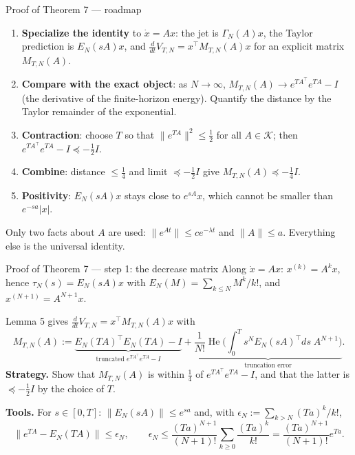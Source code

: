 \documentclass[10pt,aspectratio=169]{beamer}
\newcommand{\tr}{^{\top}}
\newcommand{\KK}{\mathcal{K}}
\DeclareMathOperator{\He}{He}
\begin{document}
\begin{frame}{Proof of Theorem 7 --- roadmap}
\begin{enumerate}
\item \textbf{Specialize the identity} to $\dot x=Ax$: the jet is $\Gamma_N(A)x$, the Taylor prediction is $E_N(sA)x$, and $\frac{d}{dt}V_{T,N}=x\tr M_{T,N}(A)x$ for an explicit matrix $M_{T,N}(A)$.
\item \textbf{Compare with the exact object}: as $N\to\infty$, $M_{T,N}(A)\to e^{TA\tr}e^{TA}-I$ (the derivative of the finite-horizon energy). Quantify the distance by the Taylor remainder of the exponential.
\item \textbf{Contraction}: choose $T$ so that $\|e^{TA}\|^2\le\frac12$ for all $A\in\KK$; then $e^{TA\tr}e^{TA}-I\preceq-\frac12I$.
\item \textbf{Combine}: distance $\le\frac14$ and limit $\preceq-\frac12I$ give $M_{T,N}(A)\preceq-\frac14I$.
\item \textbf{Positivity}: $E_N(sA)x$ stays close to $e^{sA}x$, which cannot be smaller than $e^{-sa}|x|$.
\end{enumerate}
\medskip
Only two facts about $A$ are used: $\|e^{At}\|\le ce^{-\lambda t}$ and $\|A\|\le a$. Everything else is the universal identity.
\end{frame}

\begin{frame}{Proof of Theorem 7 --- step 1: the decrease matrix}
Along $\dot x=Ax$: $x^{(k)}=A^kx$, hence $\tau_N(s)=E_N(sA)x$ with $E_N(M)=\sum_{k\le N}M^k/k!$, and $x^{(N+1)}=A^{N+1}x$.
\medskip

Lemma 5 gives $\frac{d}{dt}V_{T,N}=x\tr M_{T,N}(A)x$ with
\[
M_{T,N}(A):=\underbrace{E_N(TA)\tr E_N(TA)-I}_{\text{truncated }e^{TA\tr}e^{TA}-I}+\underbrace{\frac{1}{N!}\He\Big(\int_0^Ts^NE_N(sA)\tr ds\;A^{N+1}\Big)}_{\text{truncation error}} .
\]
\medskip
\textbf{Strategy.} Show that $M_{T,N}(A)$ is within $\frac14$ of $e^{TA\tr}e^{TA}-I$, and that the latter is $\preceq-\frac12I$ by the choice of $T$.
\medskip

\textbf{Tools.} For $s\in[0,T]$: $\|E_N(sA)\|\le e^{sa}$ and, with $\epsilon_N:=\sum_{k>N}(Ta)^k/k!$,
\[
\|e^{TA}-E_N(TA)\|\le\epsilon_N,\qquad \epsilon_N\le\frac{(Ta)^{N+1}}{(N+1)!}\sum_{k\ge0}\frac{(Ta)^k}{k!}=\frac{(Ta)^{N+1}}{(N+1)!}e^{Ta}.
\]
\end{frame}
\end{document}
